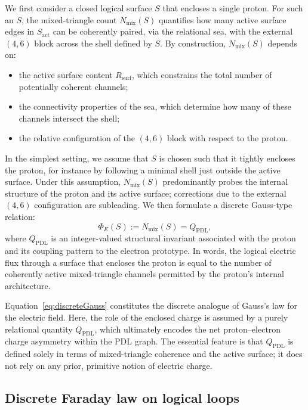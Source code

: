 \documentclass[11pt,a4paper]{article}
\begin{document}
We first consider a closed logical surface $S$ that encloses a single proton.
For such an $S$, the mixed-triangle count $N_{\mathrm{mix}}(S)$ quantifies how many active surface edges in $S_{\mathrm{act}}$ can be coherently paired, via the relational sea, with the external $(4,6)$ block across the shell defined by $S$.\cite{Laubscher2026Alpha,Laubscher2026SchrodingerSketch}
By construction, $N_{\mathrm{mix}}(S)$ depends on:
\begin{itemize}
  \item the active surface content $R_{\mathrm{surf}}$, which constrains the total number of potentially coherent channels;
  \item the connectivity properties of the sea, which determine how many of these channels intersect the shell;
  \item the relative configuration of the $(4,6)$ block with respect to the proton.
\end{itemize}

In the simplest setting, we assume that $S$ is chosen such that it tightly encloses the proton, for instance by following a minimal shell just outside the active surface.
Under this assumption, $N_{\mathrm{mix}}(S)$ predominantly probes the internal structure of the proton and its active surface; corrections due to the external $(4,6)$ configuration are subleading.
We then formulate a discrete Gauss-type relation:
\begin{equation}
\Phi_{E}(S) := N_{\mathrm{mix}}(S) = Q_{\mathrm{PDL}},
\label{eq:discreteGauss}
\end{equation}
where $Q_{\mathrm{PDL}}$ is an integer-valued structural invariant associated with the proton and its coupling pattern to the electron prototype.
In words, the logical electric flux through a surface that encloses the proton is equal to the number of coherently active mixed-triangle channels permitted by the proton’s internal architecture.

Equation~\eqref{eq:discreteGauss} constitutes the discrete analogue of Gauss’s law for the electric field.
Here, the role of the enclosed charge is assumed by a purely relational quantity $Q_{\mathrm{PDL}}$, which ultimately encodes the net proton–electron charge asymmetry within the PDL graph.\cite{Laubscher2026FullPDL,Laubscher2026Alpha}
The essential feature is that $Q_{\mathrm{PDL}}$ is defined solely in terms of mixed-triangle coherence and the active surface; it does not rely on any prior, primitive notion of electric charge.

\subsection{Discrete Faraday law on logical loops}
\end{document}
